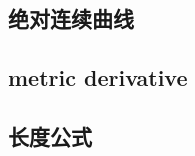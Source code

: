 

\subsection{绝对连续曲线}
\label{b1:subsec:160401}

\subsection{metric derivative}
\label{b1:subsec:160402}

\subsection{长度公式}
\label{b1:subsec:160403}


